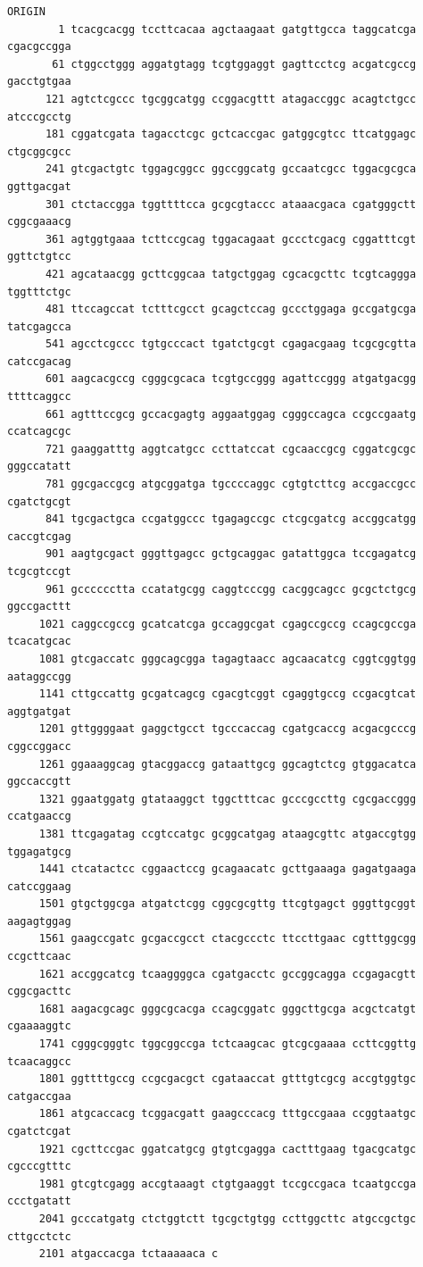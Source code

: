 \begin{verbatim}
ORIGIN      
        1 tcacgcacgg tccttcacaa agctaagaat gatgttgcca taggcatcga cgacgccgga
       61 ctggcctggg aggatgtagg tcgtggaggt gagttcctcg acgatcgccg gacctgtgaa
      121 agtctcgccc tgcggcatgg ccggacgttt atagaccggc acagtctgcc atcccgcctg
      181 cggatcgata tagacctcgc gctcaccgac gatggcgtcc ttcatggagc ctgcggcgcc
      241 gtcgactgtc tggagcggcc ggccggcatg gccaatcgcc tggacgcgca ggttgacgat
      301 ctctaccgga tggttttcca gcgcgtaccc ataaacgaca cgatgggctt cggcgaaacg
      361 agtggtgaaa tcttccgcag tggacagaat gccctcgacg cggatttcgt ggttctgtcc
      421 agcataacgg gcttcggcaa tatgctggag cgcacgcttc tcgtcaggga tggtttctgc
      481 ttccagccat tctttcgcct gcagctccag gccctggaga gccgatgcga tatcgagcca
      541 agcctcgccc tgtgcccact tgatctgcgt cgagacgaag tcgcgcgtta catccgacag
      601 aagcacgccg cgggcgcaca tcgtgccggg agattccggg atgatgacgg ttttcaggcc
      661 agtttccgcg gccacgagtg aggaatggag cgggccagca ccgccgaatg ccatcagcgc
      721 gaaggatttg aggtcatgcc ccttatccat cgcaaccgcg cggatcgcgc gggccatatt
      781 ggcgaccgcg atgcggatga tgccccaggc cgtgtcttcg accgaccgcc cgatctgcgt
      841 tgcgactgca ccgatggccc tgagagccgc ctcgcgatcg accggcatgg caccgtcgag
      901 aagtgcgact gggttgagcc gctgcaggac gatattggca tccgagatcg tcgcgtccgt
      961 gcccccctta ccatatgcgg caggtcccgg cacggcagcc gcgctctgcg ggccgacttt
     1021 caggccgccg gcatcatcga gccaggcgat cgagccgccg ccagcgccga tcacatgcac
     1081 gtcgaccatc gggcagcgga tagagtaacc agcaacatcg cggtcggtgg aataggccgg
     1141 cttgccattg gcgatcagcg cgacgtcggt cgaggtgccg ccgacgtcat aggtgatgat
     1201 gttggggaat gaggctgcct tgcccaccag cgatgcaccg acgacgcccg cggccggacc
     1261 ggaaaggcag gtacggaccg gataattgcg ggcagtctcg gtggacatca ggccaccgtt
     1321 ggaatggatg gtataaggct tggctttcac gcccgccttg cgcgaccggg ccatgaaccg
     1381 ttcgagatag ccgtccatgc gcggcatgag ataagcgttc atgaccgtgg tggagatgcg
     1441 ctcatactcc cggaactccg gcagaacatc gcttgaaaga gagatgaaga catccggaag
     1501 gtgctggcga atgatctcgg cggcgcgttg ttcgtgagct gggttgcggt aagagtggag
     1561 gaagccgatc gcgaccgcct ctacgccctc ttccttgaac cgtttggcgg ccgcttcaac
     1621 accggcatcg tcaaggggca cgatgacctc gccggcagga ccgagacgtt cggcgacttc
     1681 aagacgcagc gggcgcacga ccagcggatc gggcttgcga acgctcatgt cgaaaaggtc
     1741 cgggcgggtc tggcggccga tctcaagcac gtcgcgaaaa ccttcggttg tcaacaggcc
     1801 ggttttgccg ccgcgacgct cgataaccat gtttgtcgcg accgtggtgc catgaccgaa
     1861 atgcaccacg tcggacgatt gaagcccacg tttgccgaaa ccggtaatgc cgatctcgat
     1921 cgcttccgac ggatcatgcg gtgtcgagga cactttgaag tgacgcatgc cgcccgtttc
     1981 gtcgtcgagg accgtaaagt ctgtgaaggt tccgccgaca tcaatgccga ccctgatatt
     2041 gcccatgatg ctctggtctt tgcgctgtgg ccttggcttc atgccgctgc cttgcctctc
     2101 atgaccacga tctaaaaaca c
\end{verbatim}


